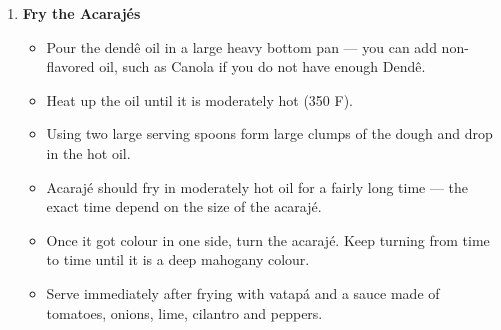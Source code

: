 \documentclass[11pt,letterpaper]{article}
\begin{document}
\begin{description}
\begin{enumerate}
	\item {\bf Fry the Acaraj\'es}
	\begin{itemize}
	\item Pour the dend\^e oil in a large heavy bottom pan --- you can add non-flavored oil, such as Canola if you do not have enough Dend\^e.
	\item Heat up the oil until it is moderately hot (350 F).
	\item Using two large serving spoons form large clumps of the dough and drop in the hot oil.
	\item Acaraj\'e should fry in moderately hot oil for a fairly long time --- the exact time depend on the size of the acaraj\'e.
	\item Once it got colour in one side, turn the acaraj\'e. Keep turning from time to time until it is a deep mahogany colour.
	\item Serve immediately after frying with vatap\'a and a sauce made of tomatoes, onions, lime, cilantro and peppers.
	\end{itemize}

	\end{enumerate}
\end{description}
\end{document}
